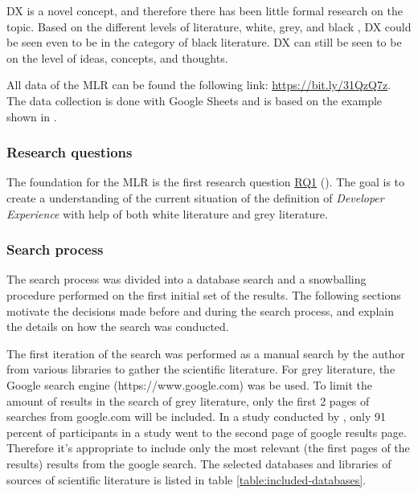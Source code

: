 \documentclass[english, 12pt, a4paper, sci, utf8, a-1b, online]{aaltothesis}
\newcounter{subsubsubsection}[subsubsection]
\begin{document}
DX is a novel concept, and therefore there has been little formal research on the topic. Based on the different levels of literature, white, grey, and black \parencite{guidelines-for-MLR}, DX could be seen even to be in the category of black literature. DX can still be seen to be on the level of ideas, concepts, and thoughts.

\newcommand{\mlrdxlink}{https://bit.ly/31QzQ7z}

All data of the MLR can be found the following link: \href{\mlrdxlink}{https://bit.ly/31QzQ7z}. The data collection is done with Google Sheets and is based on the example shown in \parencite{guidelines-for-MLR}.

\subsubsection{Research questions}

The foundation for the MLR is the first research question \hyperref[RQ1]{RQ1} (\rqone). The goal is to create a understanding of the current situation of the definition of \textit{Developer Experience} with help of both white literature and grey literature.

\subsubsection{Search process}

The search process was divided into a database search and a snowballing procedure performed on the first initial set of the results. The following sections motivate the decisions made before and during the search process, and explain the details on how the search was conducted.


The first iteration of the search was performed as a manual search by the author from various libraries to gather the scientific literature. For grey literature, the Google search engine (https://www.google.com) was be used. To limit the amount of results in the search of grey literature, only the first 2 pages of searches from google.com will be included. In a study conducted by \textcite{google-search}, only 91 percent of participants in a study went to the second page of google results page. Therefore it's appropriate to include only the most relevant (the first pages of the results) results from the google search. The selected databases and libraries of sources of scientific literature is listed in table \ref{table:included-databases}.
\end{document}
